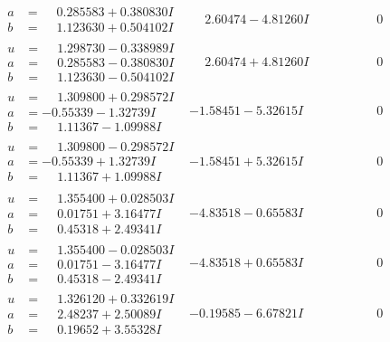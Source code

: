 \documentclass[1p]{elsarticle_modified}
\theoremstyle{definition}
\begin{document}
$$\begin{array}{c|c|c}
\begin{aligned}
a &= \phantom{-}0.285583 + 0.380830 I \\
b &= \phantom{-}1.123630 + 0.504102 I\end{aligned}
 & \phantom{-}2.60474 - 4.81260 I & \phantom{-0.000000 } 0 \\ \hline\begin{aligned}
u &= \phantom{-}1.298730 - 0.338989 I \\
a &= \phantom{-}0.285583 - 0.380830 I \\
b &= \phantom{-}1.123630 - 0.504102 I\end{aligned}
 & \phantom{-}2.60474 + 4.81260 I & \phantom{-0.000000 } 0 \\ \hline\begin{aligned}
u &= \phantom{-}1.309800 + 0.298572 I \\
a &= -0.55339 - 1.32739 I \\
b &= \phantom{-}1.11367 - 1.09988 I\end{aligned}
 & -1.58451 - 5.32615 I & \phantom{-0.000000 } 0 \\ \hline\begin{aligned}
u &= \phantom{-}1.309800 - 0.298572 I \\
a &= -0.55339 + 1.32739 I \\
b &= \phantom{-}1.11367 + 1.09988 I\end{aligned}
 & -1.58451 + 5.32615 I & \phantom{-0.000000 } 0 \\ \hline\begin{aligned}
u &= \phantom{-}1.355400 + 0.028503 I \\
a &= \phantom{-}0.01751 + 3.16477 I \\
b &= \phantom{-}0.45318 + 2.49341 I\end{aligned}
 & -4.83518 - 0.65583 I & \phantom{-0.000000 } 0 \\ \hline\begin{aligned}
u &= \phantom{-}1.355400 - 0.028503 I \\
a &= \phantom{-}0.01751 - 3.16477 I \\
b &= \phantom{-}0.45318 - 2.49341 I\end{aligned}
 & -4.83518 + 0.65583 I & \phantom{-0.000000 } 0 \\ \hline\begin{aligned}
u &= \phantom{-}1.326120 + 0.332619 I \\
a &= \phantom{-}2.48237 + 2.50089 I \\
b &= \phantom{-}0.19652 + 3.55328 I\end{aligned}
 & -0.19585 - 6.67821 I & \phantom{-0.000000 } 0 \\ \hline\begin{aligned}

\end{aligned}
\end{array}$$
\end{document}

